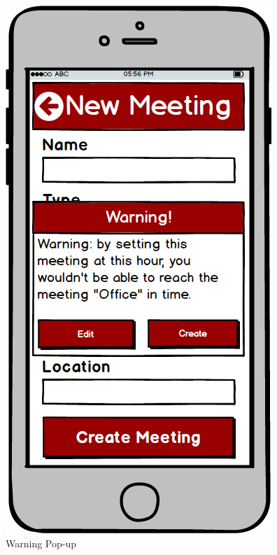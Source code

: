 \begin{figure}[!htb]
\begin{minipage}[b]{0.3\textwidth}
	\centering
	\includegraphics[scale=0.3]{images/warning}
	\caption{Warning Pop-up}
	\label{ref:warning}
\end{minipage}
\hfill
\begin{minipage}[b]{0.3\textwidth}
	\centering

\end{minipage}
\end{figure}
